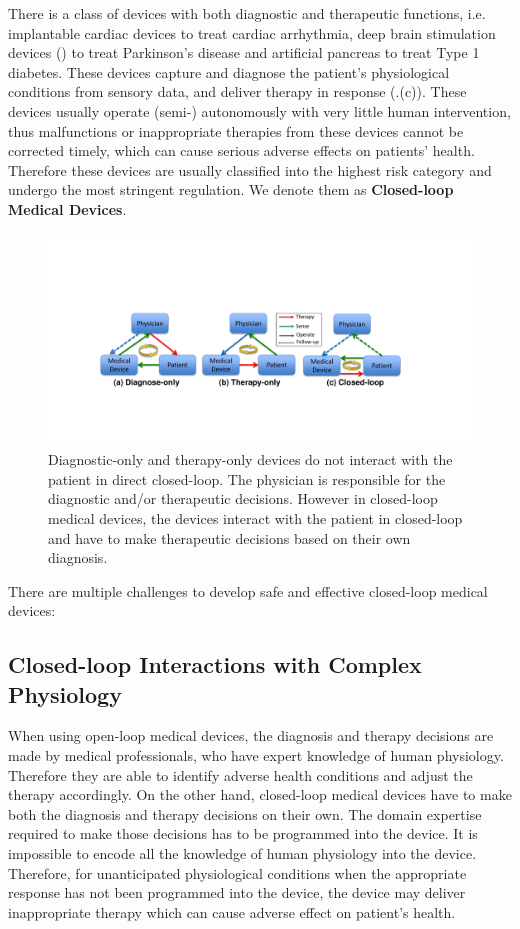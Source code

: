 There is a class of devices with both diagnostic and therapeutic functions, i.e. implantable cardiac devices to treat cardiac arrhythmia, deep brain stimulation devices (\cite{Brain_sti}) to treat Parkinson's disease and artificial pancreas to treat Type 1 diabetes. These devices capture and diagnose the patient's physiological conditions from sensory data, and deliver therapy in response (.(c)). These devices usually operate (semi-) autonomously with very little human intervention, thus malfunctions or inappropriate therapies from these devices cannot be corrected timely, which can cause serious adverse effects on patients' health. Therefore these devices are usually classified into the highest risk category and undergo the most stringent regulation. We denote them as \textbf{Closed-loop Medical Devices}. 
\begin{figure}[t]
		\centering
		\includegraphics[width=\textwidth]{figs/closed-loop.pdf}
		\caption{\small Diagnostic-only and therapy-only devices do not interact with the patient in direct closed-loop. The physician is responsible for the diagnostic and/or therapeutic decisions. However in closed-loop medical devices, the devices interact with the patient in closed-loop and have to make therapeutic decisions based on their own diagnosis.}
		\label{fig:closed-loop}
\end{figure}
There are multiple challenges to develop safe and effective closed-loop medical devices:

\subsection{Closed-loop Interactions with Complex Physiology}
When using open-loop medical devices, the diagnosis and therapy decisions are made by medical professionals, who have expert knowledge of human physiology. Therefore they are able to identify adverse health conditions and adjust the therapy accordingly. On the other hand, closed-loop medical devices have to make both the diagnosis and therapy decisions on their own. The domain expertise required to make those decisions has to be programmed into the device. It is impossible to encode all the knowledge of human physiology into the device. Therefore, for unanticipated physiological conditions when the appropriate response has not been programmed into the device, the device may deliver inappropriate therapy which can cause adverse effect on patient's health. 

